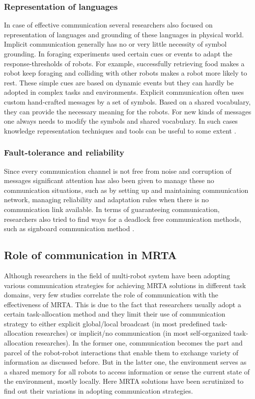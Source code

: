 \subsubsection*{Representation of languages}
In case of effective communication several researchers also focused on representation of languages and grounding of these languages in physical world. Implicit communication generally has no or very little necessity of symbol grounding. In foraging experiments  used certain cues or events to adapt the response-thresholds  of robots. For example, successfully retrieving food makes a robot keep foraging and colliding with other robots makes a robot more likely to rest. These simple cues are based on dynamic events but they can hardly be adopted in complex tasks and environments. Explicit communication often uses custom hand-crafted messages by a set of symbols. Based on a shared vocabulary, they can provide the necessary meaning for the robots. For new kinds of messages one always needs to modify the symbols and shared vocabulary. In such cases knowledge representation techniques and tools can be useful to some extent \cite{Parker2008}.
\subsubsection*{Fault-tolerance and reliability}
Since every communication channel is not free from noise and corruption of messages significant attention has  also been  given to manage these no communication situations, such as by setting up and maintaining communication network, managing reliability and adaptation rules when there is no communication link available. In terms of guaranteeing communication, researchers also tried to find ways for a deadlock free communication methods, such as signboard communication method \cite{Wang1989}.
\subsection{Role of communication in MRTA}
Although researchers in the field of multi-robot system have been adopting various communication strategies for achieving MRTA solutions in different task domains, very few studies correlate the role of communication with the effectiveness of MRTA. This is due to the fact that researchers usually adopt a certain task-allocation method and they limit their use of communication strategy to either explicit global/local broadcast (in most predefined task-allocation researches) or  implicit/no communication (in most self-organized task-allocation researches). In the former one, communication becomes the part and parcel of the robot-robot interactions that enable them to exchange variety of information as discussed before. But in the latter one, the environment serves as a shared memory for all robots to access information or sense the current state of the environment, mostly locally. Here MRTA solutions have been scrutinized to find out their variations in adopting communication strategies.

